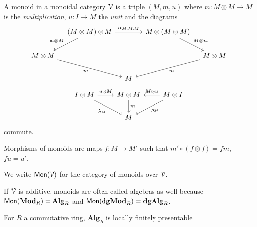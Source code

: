 \documentclass[a4paper,11pt,oneside,openany]{scrbook}
\begin{document}
\begin{defn}
	A monoid in a monoidal category $\operatorname{\mathcal{V}}$ is a triple $(M,m,u)$ where $m\colon M\otimes M\rightarrow M$ is the \emph{multiplication}, $u\colon I\rightarrow M$ the \emph{unit} and the diagrams
	\[
		\begin{tikzcd}[column sep=1.0em]
			& (M\otimes M)\otimes M\ar[rr, "\alpha_{M,M,M}"]\ar[dl, "m\otimes M", swap]
			&& M\otimes (M\otimes M)\ar[dr, "M\otimes m"] \\
			M\otimes M\ar[drr, "m", swap]
			&&&& M\otimes M\ar[dll, "m"] \\
			&& M
		\end{tikzcd}
	\]
	\[
		\begin{tikzcd}
			I\otimes M\ar[r, "u\otimes M"]\ar[dr, "\lambda_M", swap]
			& M\otimes M\ar[d, "m"]
			& M\otimes I\ar[l, "M\otimes u", swap]\ar[dl, "\rho_M"] \\
			& M
		\end{tikzcd}
	\]
	commute.

	Morphisms of monoids are maps $f\colon M\rightarrow M'$ such that $m'\circ (f\otimes f)=fm$, $fu=u'$.

	We write $\operatorname{\mathsf{Mon}}(\operatorname{\mathcal{V}})$ for the category of monoids over $\operatorname{\mathcal{V}}$.
\end{defn}

\begin{rmk}
	If $\operatorname{\mathcal{V}}$ is additive, monoids are often called algebras as well because     $\operatorname{\mathsf{Mon}}({\normalfont\textbf{Mod}}_R)=\mathbf{Alg}_R$ and $\operatorname{\mathsf{Mon}}({\normalfont\textbf{dgMod}}_R)=\mathbf{dgAlg}_R$.
\end{rmk}


\begin{exmp}
	For $ R $ a commutative ring, $ \mathbf{Alg}_R $ is locally finitely presentable
\end{exmp}
\end{document}
